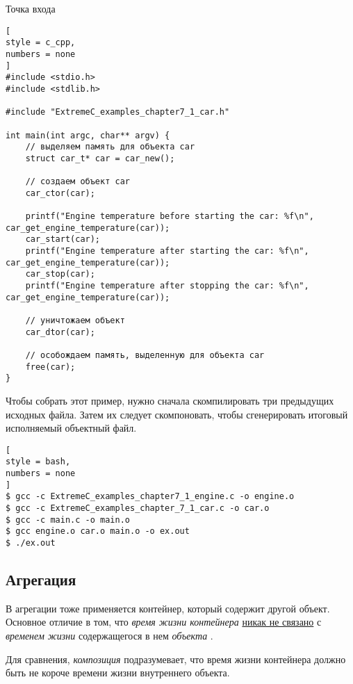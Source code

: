 \documentclass[%
	11pt,
	a4paper,
	utf8,
		]{article}
\begin{document}
Точка входа
\begin{lstlisting}[
style = c_cpp,
numbers = none
]
#include <stdio.h>
#include <stdlib.h>

#include "ExtremeC_examples_chapter7_1_car.h"

int main(int argc, char** argv) {
    // выделяем память для объекта car
    struct car_t* car = car_new();
    
    // создаем объект car
    car_ctor(car);
    
    printf("Engine temperature before starting the car: %f\n", car_get_engine_temperature(car));
    car_start(car);
    printf("Engine temperature after starting the car: %f\n", car_get_engine_temperature(car));
    car_stop(car);
    printf("Engine temperature after stopping the car: %f\n", car_get_engine_temperature(car));
    
    // уничтожаем объект
    car_dtor(car);
    
    // особождаем память, выделенную для объекта car
    free(car);
}
\end{lstlisting}

Чтобы собрать этот пример, нужно сначала скомпилировать три предыдущих исходных файла. Затем их следует скомпоновать, чтобы сгенерировать итоговый исполняемый объектный файл. 
\begin{lstlisting}[
style = bash,
numbers = none
]
$ gcc -c ExtremeC_examples_chapter7_1_engine.c -o engine.o
$ gcc -c ExtremeC_examples_chapter_7_1_car.c -o car.o
$ gcc -c main.c -o main.o
$ gcc engine.o car.o main.o -o ex.out
$ ./ex.out
\end{lstlisting}

\subsection{Агрегация}

В агрегации тоже применяется контейнер, который содержит другой объект. Основное отличие в том, что \emph{время жизни контейнера} \underline{никак не связано} с \emph{временем жизни} содержащегося в нем \emph{объекта} \cite[]{amini-extreme-c:2022}.

Для сравнения, \emph{композиция} подразумевает, что время жизни контейнера должно быть не короче времени жизни внутреннего объекта.
\end{document}
